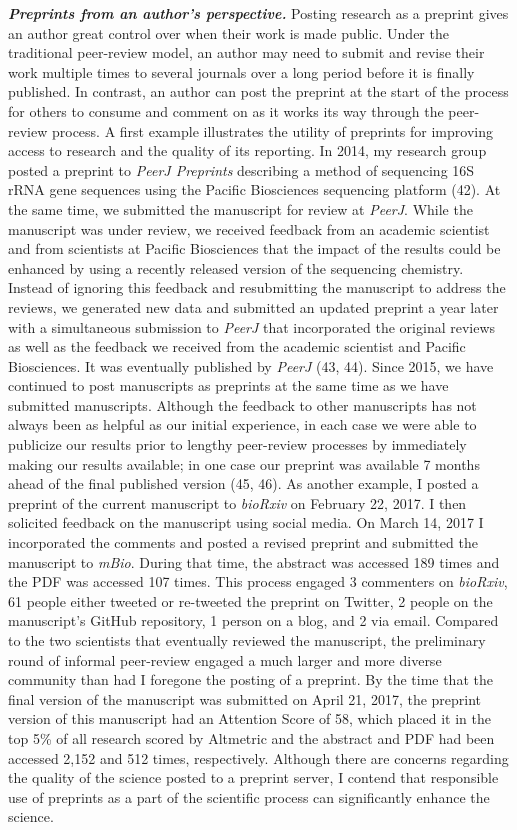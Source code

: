 \documentclass[11,]{article}
\begin{document}
\textbf{\emph{Preprints from an author's perspective.}} Posting research
as a preprint gives an author great control over when their work is made
public. Under the traditional peer-review model, an author may need to
submit and revise their work multiple times to several journals over a
long period before it is finally published. In contrast, an author can
post the preprint at the start of the process for others to consume and
comment on as it works its way through the peer-review process. A first
example illustrates the utility of preprints for improving access to
research and the quality of its reporting. In 2014, my research group
posted a preprint to \emph{PeerJ Preprints} describing a method of
sequencing 16S rRNA gene sequences using the Pacific Biosciences
sequencing platform (42). At the same time, we submitted the manuscript
for review at \emph{PeerJ}. While the manuscript was under review, we
received feedback from an academic scientist and from scientists at
Pacific Biosciences that the impact of the results could be enhanced by
using a recently released version of the sequencing chemistry. Instead
of ignoring this feedback and resubmitting the manuscript to address the
reviews, we generated new data and submitted an updated preprint a year
later with a simultaneous submission to \emph{PeerJ} that incorporated
the original reviews as well as the feedback we received from the
academic scientist and Pacific Biosciences. It was eventually published
by \emph{PeerJ} (43, 44). Since 2015, we have continued to post
manuscripts as preprints at the same time as we have submitted
manuscripts. Although the feedback to other manuscripts has not always
been as helpful as our initial experience, in each case we were able to
publicize our results prior to lengthy peer-review processes by
immediately making our results available; in one case our preprint was
available 7 months ahead of the final published version (45, 46). As
another example, I posted a preprint of the current manuscript to
\emph{bioRxiv} on February 22, 2017. I then solicited feedback on the
manuscript using social media. On March 14, 2017 I incorporated the
comments and posted a revised preprint and submitted the manuscript to
\emph{mBio}. During that time, the abstract was accessed 189 times and
the PDF was accessed 107 times. This process engaged 3 commenters on
\emph{bioRxiv}, 61 people either tweeted or re-tweeted the preprint on
Twitter, 2 people on the manuscript's GitHub repository, 1 person on a
blog, and 2 via email. Compared to the two scientists that eventually
reviewed the manuscript, the preliminary round of informal peer-review
engaged a much larger and more diverse community than had I foregone the
posting of a preprint. By the time that the final version of the
manuscript was submitted on April 21, 2017, the preprint version of this
manuscript had an Attention Score of 58, which placed it in the top 5\%
of all research scored by Altmetric and the abstract and PDF had been
accessed 2,152 and 512 times, respectively. Although there are concerns
regarding the quality of the science posted to a preprint server, I
contend that responsible use of preprints as a part of the scientific
process can significantly enhance the science.
\end{document}
